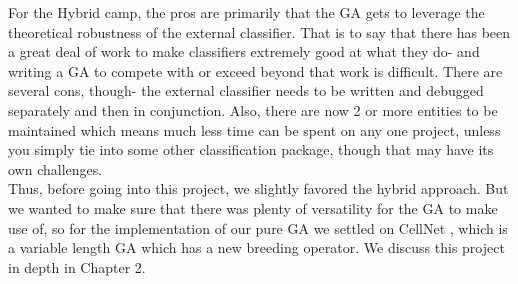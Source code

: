 For the Hybrid camp, the pros are primarily that the GA gets to leverage the theoretical robustness of the external classifier.  That is to say that there has been a great deal of work to make classifiers extremely good at what they do- and writing a GA to compete with or exceed beyond that work is difficult.  There are several cons, though- the external classifier needs to be written and debugged separately and then in conjunction.  Also, there are now 2 or more entities to be maintained which means much less time can be spent on any one project, unless you simply tie into some other classification package, though that may have its own challenges.\\
Thus, before going into this project, we slightly favored the hybrid approach.  But we wanted to make sure that there was plenty of versatility for the GA to make use of, so for the implementation of our pure GA we settled on CellNet \cite{kharma_project_2004}, which is a variable length GA which has a new breeding operator.  We discuss this project in depth in Chapter 2.  

